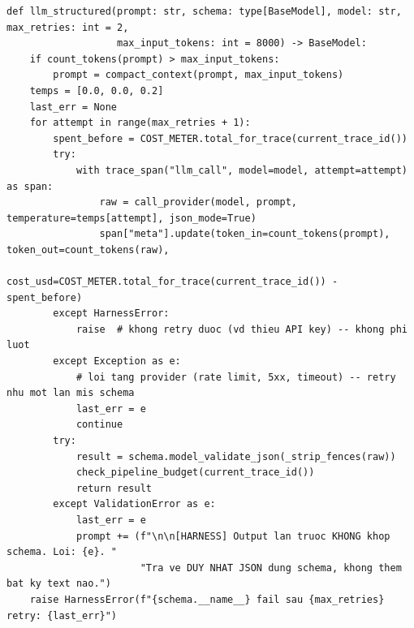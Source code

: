 \documentclass[12pt,a4paper]{article}
\begin{document}
\begin{lstlisting}
def llm_structured(prompt: str, schema: type[BaseModel], model: str, max_retries: int = 2,
                   max_input_tokens: int = 8000) -> BaseModel:
    if count_tokens(prompt) > max_input_tokens:
        prompt = compact_context(prompt, max_input_tokens)
    temps = [0.0, 0.0, 0.2]
    last_err = None
    for attempt in range(max_retries + 1):
        spent_before = COST_METER.total_for_trace(current_trace_id())
        try:
            with trace_span("llm_call", model=model, attempt=attempt) as span:
                raw = call_provider(model, prompt, temperature=temps[attempt], json_mode=True)
                span["meta"].update(token_in=count_tokens(prompt), token_out=count_tokens(raw),
                                    cost_usd=COST_METER.total_for_trace(current_trace_id()) - spent_before)
        except HarnessError:
            raise  # khong retry duoc (vd thieu API key) -- khong phi luot
        except Exception as e:
            # loi tang provider (rate limit, 5xx, timeout) -- retry nhu mot lan mis schema
            last_err = e
            continue
        try:
            result = schema.model_validate_json(_strip_fences(raw))
            check_pipeline_budget(current_trace_id())
            return result
        except ValidationError as e:
            last_err = e
            prompt += (f"\n\n[HARNESS] Output lan truoc KHONG khop schema. Loi: {e}. "
                       "Tra ve DUY NHAT JSON dung schema, khong them bat ky text nao.")
    raise HarnessError(f"{schema.__name__} fail sau {max_retries} retry: {last_err}")
\end{lstlisting}
\end{document}
